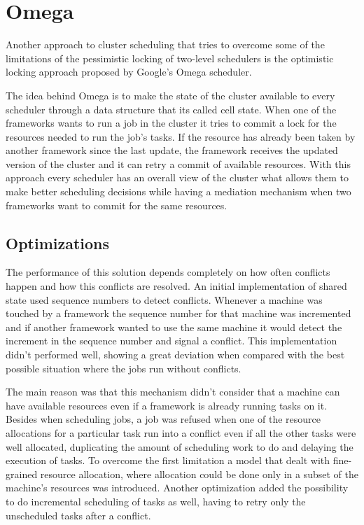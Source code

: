 \documentclass{article}                     %
\begin{document}
\section{Omega}
\label{sec:omega}

Another approach to cluster scheduling that tries to overcome some of
the limitations of the pessimistic locking of two-level schedulers is
the optimistic locking approach proposed by Google's Omega
scheduler.

The idea behind Omega is to make the state of the cluster available to
every scheduler through a data structure that its called cell
state. When one of the frameworks wants to run a job in the cluster it
tries to commit a lock for the resources needed to run the job's
tasks. If the resource has already been taken by another framework
since the last update, the framework receives the updated version of
the cluster and it can retry a commit of available resources. With
this approach every scheduler has an overall view of the cluster what
allows them to make better scheduling decisions while having a
mediation mechanism when two frameworks want to commit for the same
resources.

\subsection{Optimizations}

The performance of this solution depends completely on how often
conflicts happen and how this conflicts are resolved. An initial
implementation of shared state used sequence numbers to detect
conflicts. Whenever a machine was touched by a framework the sequence
number for that machine was incremented and if another framework
wanted to use the same machine it would detect the increment in the
sequence number and signal a conflict. This implementation didn't
performed well, showing a great deviation when compared with the best
possible situation where the jobs run without conflicts.

The main reason was that this mechanism didn't consider that a machine
can have available resources even if a framework is already running
tasks on it. Besides when scheduling jobs, a job was refused when one
of the resource allocations for a particular task run into a
conflict even if all the other tasks were well allocated, duplicating
the amount of scheduling work to do and delaying the execution of
tasks. To overcome the first limitation a model that dealt with
fine-grained resource allocation, where allocation could be done only
in a subset of the machine's resources was introduced. Another
optimization added the possibility to do incremental scheduling of
tasks as well, having to retry only the unscheduled tasks after a
conflict.
\end{document}
